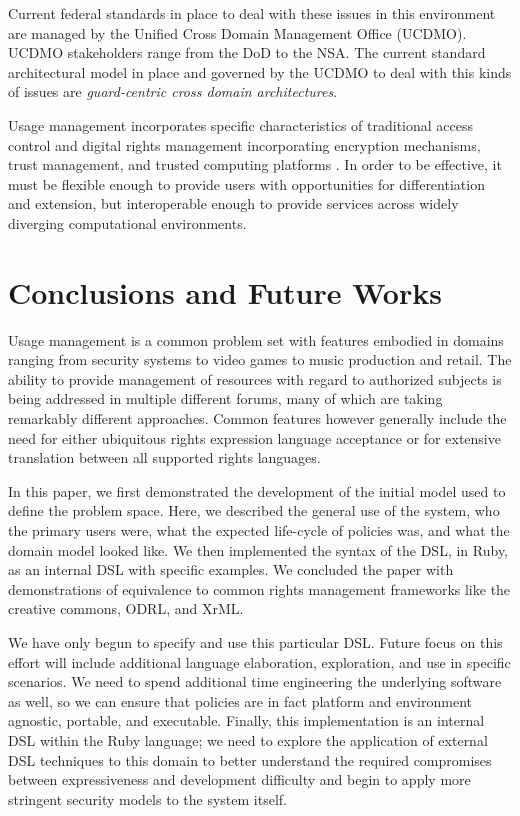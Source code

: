 \documentclass{acm_proc_article-sp}
\begin{document}
Current federal standards in place to deal with these issues in this environment are managed by the Unified Cross Domain Management Office (UCDMO).  UCDMO stakeholders range from the DoD to the NSA.  The current standard architectural model in place and governed by the UCDMO to deal with this kinds of issues are \textit{guard-centric cross domain architectures}.

Usage management incorporates specific characteristics of traditional access control and digital rights management incorporating encryption mechanisms, trust management, and trusted computing platforms \cite{Jamkhedkar:2010:IUM:1866870.1866885}.  In order to be effective, it must be flexible enough to provide users with opportunities for differentiation and extension, but interoperable enough to provide services across widely diverging computational environments.

\section{Conclusions and Future Works}
Usage management is a common problem set with features embodied in domains ranging from security systems to video games to music production and retail.  The ability to provide management of resources with regard to authorized subjects is being addressed in multiple different forums, many of which are taking remarkably different approaches.  Common features however generally include the need for either ubiquitous rights expression language acceptance or for extensive translation between all supported rights languages.

In this paper, we first demonstrated the development of the initial model used to define the problem space.  Here, we described the general use of the system, who the primary users were, what the expected life-cycle of policies was, and what the domain model looked like.  We then implemented the syntax of the DSL, in Ruby, as an internal DSL with specific examples.  We concluded the paper with demonstrations of equivalence to common rights management frameworks like the creative commons, ODRL, and XrML.

We have only begun to specify and use this particular DSL.  Future focus on this effort will include additional language elaboration, exploration, and use in specific scenarios.  We need to spend additional time engineering the underlying software as well, so we can ensure that policies are in fact platform and environment agnostic, portable, and executable.  Finally, this implementation is an internal DSL within the Ruby language; we need to explore the application of external DSL techniques to this domain to better understand the required compromises between expressiveness and development difficulty and begin to apply more stringent security models to the system itself.



\end{document}
